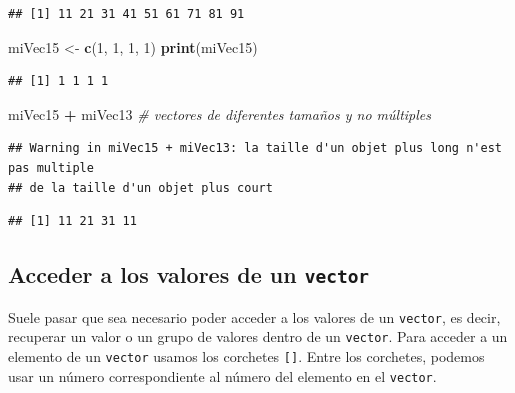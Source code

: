 \documentclass[
]{book}
\newenvironment{Shaded}{\begin{snugshade}}{\end{snugshade}}
\newcommand{\CommentTok}[1]{\textcolor[rgb]{0.56,0.35,0.01}{\textit{#1}}}
\newcommand{\DecValTok}[1]{\textcolor[rgb]{0.00,0.00,0.81}{#1}}
\newcommand{\KeywordTok}[1]{\textcolor[rgb]{0.13,0.29,0.53}{\textbf{#1}}}
\newcommand{\NormalTok}[1]{#1}
\newcommand{\OperatorTok}[1]{\textcolor[rgb]{0.81,0.36,0.00}{\textbf{#1}}}
\newcommand{\StringTok}[1]{\textcolor[rgb]{0.31,0.60,0.02}{#1}}
\begin{document}
\begin{verbatim}
## [1] 11 21 31 41 51 61 71 81 91
\end{verbatim}

\begin{Shaded}
\begin{Highlighting}[]
\NormalTok{miVec15 <-}\StringTok{ }\KeywordTok{c}\NormalTok{(}\DecValTok{1}\NormalTok{, }\DecValTok{1}\NormalTok{, }\DecValTok{1}\NormalTok{, }\DecValTok{1}\NormalTok{)}
\KeywordTok{print}\NormalTok{(miVec15)}
\end{Highlighting}
\end{Shaded}

\begin{verbatim}
## [1] 1 1 1 1
\end{verbatim}

\begin{Shaded}
\begin{Highlighting}[]
\NormalTok{miVec15 }\OperatorTok{+}\StringTok{ }\NormalTok{miVec13 }\CommentTok{# vectores de diferentes tamaños y no múltiples}
\end{Highlighting}
\end{Shaded}

\begin{verbatim}
## Warning in miVec15 + miVec13: la taille d'un objet plus long n'est pas multiple
## de la taille d'un objet plus court
\end{verbatim}

\begin{verbatim}
## [1] 11 21 31 11
\end{verbatim}

\hypertarget{acceder-a-los-valores-de-un-vector}{%
\subsection{\texorpdfstring{Acceder a los valores de un \texttt{vector}}{Acceder a los valores de un vector}}\label{acceder-a-los-valores-de-un-vector}}

Suele pasar que sea necesario poder acceder a los valores de un \texttt{vector}, es decir, recuperar un valor o un grupo de valores dentro de un \texttt{vector}. Para acceder a un elemento de un \texttt{vector} usamos los corchetes \texttt{{[}{]}}. Entre los corchetes, podemos usar un número correspondiente al número del elemento en el \texttt{vector}.
\end{document}
